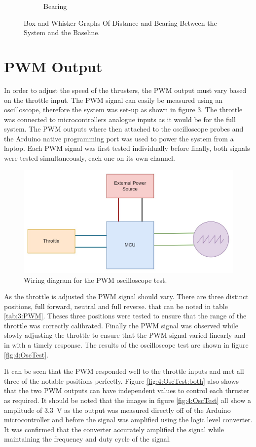 \begin{figure}[!hb]
\begin{center}
\begin{subfigure}{0.475\linewidth}
 			\caption{Bearing}
 			\label{fig:4:bearingBxWh}	
 		\end{subfigure}
 	\caption{Box and Whisker Graphs Of Distance and Bearing Between the System and the Baseline.}
 	\end{center}
 \end{figure} 
\section{PWM Output}
In order to adjust the speed of the thrusters, the PWM output must vary based on the throttle input. The PWM signal can easily be measured using an oscilloscope, therefore the system was set-up as shown in figure \ref{fig:4:PWMTest}. The throttle was connected to microcontrollers analogue inputs as it would be for the full system. The PWM outputs where then attached to the oscilloscope probes and the Arduino native programming port was used to power the system from a laptop. Each PWM signal was first tested individually before finally, both signals were tested simultaneously, each one on its own channel. \par
\begin{figure}
	\begin{center}
		\includegraphics[width=0.6\linewidth]{figures/PWMtest.jpg}
		\caption{Wiring diagram for the PWM oscilloscope test.}
		\label{fig:4:PWMTest}
	\end{center}
\end{figure}
As the throttle is adjusted the PWM signal should vary. There are three distinct positions, full forward, neutral and full reverse. that can be noted in table \ref{tab:3:PWM}. Theses three positions were tested to ensure that the range of the throttle was correctly calibrated. Finally the PWM signal was observed while slowly adjusting the throttle to ensure that the PWM signal varied linearly and in with a timely response. The results of the oscilloscope test are shown in figure \ref{fig:4:OscTest}. \par
It can be seen that the PWM responded well to the throttle inputs and met all three of the notable positions perfectly. Figure \ref{fig:4:OscTest:both} also shows that the two PWM outputs can have independent values to control each thruster as required. It should be noted that the images in figure \ref{fig:4:OscTest} all show a amplitude of \SI{3.3}{\volt} as the output was measured directly off of the Arduino microcontroller and before the signal was amplified using the logic level converter. It was confirmed that the converter accurately amplified the signal while maintaining the frequency and duty cycle of the signal.
